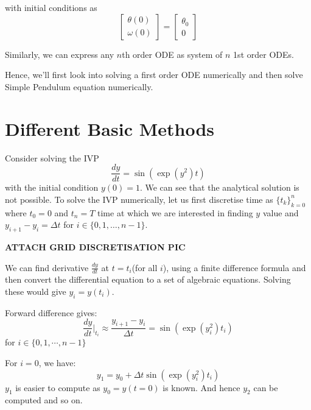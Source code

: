 \documentclass[
]{book}
\begin{document}
with initial conditions as
\begin{equation}
\begin{bmatrix} \theta(0) \\  \omega(0) \end{bmatrix}=\begin{bmatrix} \theta_0 \\  0 \end{bmatrix}
\end{equation}

Similarly, we can express any \(n\)th order ODE as system of \(n\) 1st order ODEs.

Hence, we'll first look into solving a first order ODE numerically and then solve Simple Pendulum equation numerically.

\hypertarget{different-basic-methods}{%
\section{Different Basic Methods}\label{different-basic-methods}}

Consider solving the IVP
\begin{equation}
\frac{dy}{dt} = \sin(\exp(y^2)t)
\end{equation}
with the initial condition \(y(0) = 1\). We can see that the analytical solution is not possible. To solve the IVP numerically, let us first discretise time as \(\{t_k\}_{k=0}^n\) where \(t_0 = 0\) and \(t_n=T\) time at which we are interested in finding \(y\) value and \(y_{i+1}-y_i = \Delta t\) for \(i\in\{0,1,\dots,n-1\}\).

\textbf{ATTACH GRID DISCRETISATION PIC}

We can find derivative \(\frac{dy}{dt}\) at \(t=t_i\)(for all \(i\)), using a finite difference formula and then convert the differential equation to a set of algebraic equations. Solving these would give \(y_i = y(t_i)\).

Forward difference gives:
\begin{equation}
\frac{dy}{dt}|_{t_i}\approx \frac{y_{i+1}-y_i}{\Delta t} = \sin(\exp(y_i^2)t_i)
\end{equation}
for \(i\in\{0,1,\cdots, n-1\}\)

For \(i=0\), we have:
\begin{equation}
y_1 = y_0 +\Delta t \sin(\exp(y_i^2)t_i)
\end{equation}
\(y_1\) is easier to compute as \(y_0 = y(t=0)\) is known. And hence \(y_2\) can be computed and so on.
\end{document}
